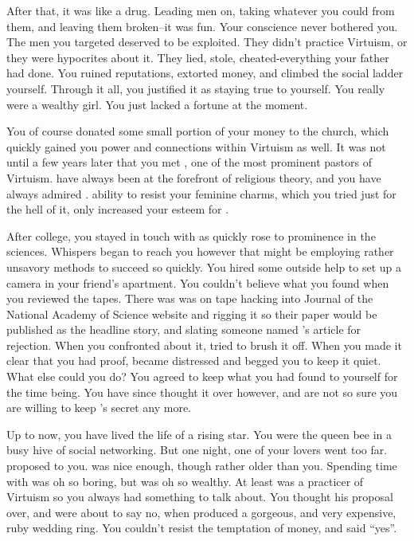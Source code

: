 \documentclass[char]{guildcamp1}
\begin{document}
After that, it was like a drug. Leading men on, taking whatever you could from them, and leaving them broken--it was fun. Your conscience never bothered you. The men you targeted deserved to be exploited. They didn't practice Virtuism, or they were hypocrites about it. They lied, stole, cheated-everything your father had done. You ruined reputations, extorted money, and climbed the social ladder yourself. Through it all, you justified it as staying true to yourself. You really were a wealthy girl. You just lacked a fortune at the moment.  

You of course donated some small portion of your money to the church, which quickly gained you power and connections within Virtuism as well. It was not until a few years later that you met \cPastor{}, one of the most prominent pastors of Virtuism. \cPastor{\They} have always been at the forefront of religious theory, and you have always admired \cPastor{\them}. \cPastor{\them} ability to resist your feminine charms, which you tried just for the hell of it, only increased your esteem for \cPastor{}. 

After college, you stayed in touch with \cRival{} as \cRival{\they} quickly rose to prominence in the sciences. Whispers began to reach you however that \cRival{} might be employing rather unsavory methods to succeed so quickly. You hired some outside help to set up a camera in your friend's apartment. You couldn't believe what you found when you reviewed the tapes. There was \cRival{} was on tape hacking into Journal of the National Academy of Science website and rigging it so their paper would be published as the headline story, and slating someone named \cScientist{}'s article for rejection. When you confronted \cRival{\them} about it, \cRival{\they} tried to brush it off. When you made it clear that you had proof, \cRival{} became distressed and begged you to keep it quiet.  What else could you do? You agreed to keep what you had found to yourself for the time being. You have since thought it over however, and are not so sure you are willing to keep \cRival{}'s secret any more.

Up to now, you have lived the life of a rising star. You were the queen bee in a busy hive of social networking. But one night, one of your lovers went too far. \cGroomA{} proposed to you. \cGroomA{\They} was nice enough, though rather older than you. Spending time with \cGroomA{\them} was oh so boring, but \cGroomA{\they} was oh so wealthy. At least \cGroomA{\they} was  a practicer of Virtuism so you always had something to talk about. You thought his proposal over, and were about to say no, when \cGroomA{\they} produced a gorgeous, and very expensive, ruby wedding ring. You couldn't resist the temptation of money, and said ``yes''.
\end{document}

